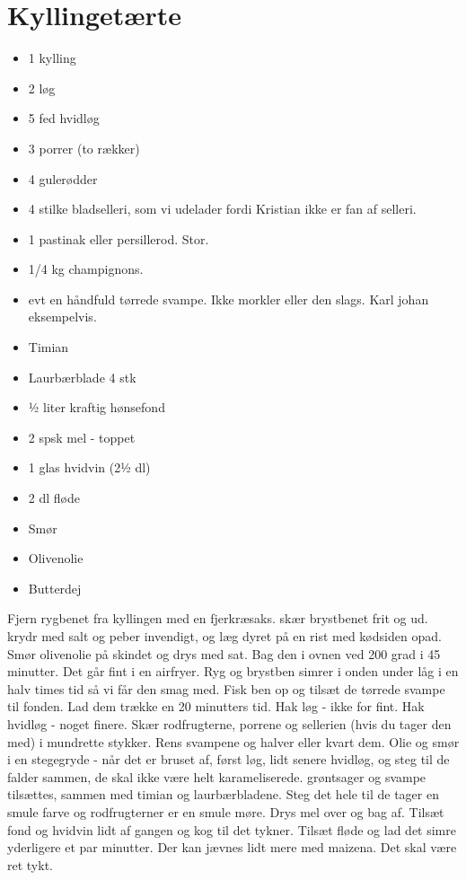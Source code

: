 \documentclass[
]{book}
\providecommand{\tightlist}{%
  \setlength{\itemsep}{0pt}\setlength{\parskip}{0pt}}
\begin{document}
\hypertarget{kyllingetuxe6rte}{%
\section{Kyllingetærte}\label{kyllingetuxe6rte}}

\begin{itemize}
\tightlist
\item
  1 kylling
\item
  2 løg
\item
  5 fed hvidløg
\item
  3 porrer (to rækker)
\item
  4 gulerødder
\item
  4 stilke bladselleri, som vi udelader fordi Kristian ikke er fan af selleri.
\item
  1 pastinak eller persillerod. Stor.
\item
  1/4 kg champignons.
\item
  evt en håndfuld tørrede svampe. Ikke morkler eller den slags. Karl johan eksempelvis.
\item
  Timian
\item
  Laurbærblade 4 stk
\item
  ½ liter kraftig hønsefond
\item
  2 spsk mel - toppet
\item
  1 glas hvidvin (2½ dl)
\item
  2 dl fløde
\item
  Smør
\item
  Olivenolie
\item
  Butterdej
\end{itemize}

Fjern rygbenet fra kyllingen med en fjerkræsaks. skær brystbenet frit og ud.
krydr med salt og peber invendigt, og læg dyret på en rist med kødsiden opad.
Smør olivenolie på skindet og drys med sat. Bag den i ovnen ved 200 grad i
45 minutter. Det går fint i en airfryer.
Ryg og brystben simrer i onden under låg i en halv times tid så vi får den
smag med. Fisk ben op og tilsæt de tørrede svampe til fonden. Lad dem trække
en 20 minutters tid.
Hak løg - ikke for fint. Hak hvidløg - noget finere. Skær rodfrugterne, porrene
og sellerien (hvis du tager den med) i mundrette stykker. Rens svampene og
halver eller kvart dem.
Olie og smør i en stegegryde - når det er bruset af, først løg, lidt senere
hvidløg, og steg til de falder sammen, de skal ikke være helt karameliserede.
grøntsager og svampe tilsættes, sammen med timian og laurbærbladene. Steg det hele
til de tager en smule farve og rodfrugterner er en smule møre. Drys mel over
og bag af. Tilsæt fond og hvidvin lidt af gangen og kog til det tykner.
Tilsæt fløde og lad det simre yderligere et par minutter. Der kan jævnes lidt
mere med maizena. Det skal være ret tykt.
\end{document}
